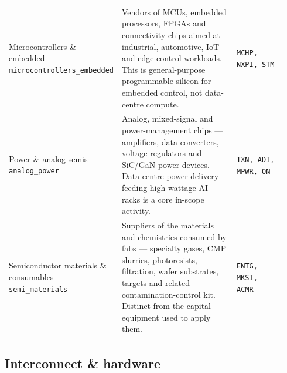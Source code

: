 \documentclass[11pt,a4paper,oneside]{article}
\begin{document}
\begin{longtable}{@{}p{0.20\linewidth} p{0.52\linewidth} p{0.22\linewidth}@{}}
\addlinespace
Microcontrollers \& embedded \newline \texttt{microcontrollers\_embedded} & Vendors of MCUs, embedded processors, FPGAs and connectivity chips aimed at industrial, automotive, IoT and edge control workloads. This is general-purpose programmable silicon for embedded control, not data-centre compute. & \texttt{MCHP, NXPI, STM} \\
\addlinespace
Power \& analog semis \newline \texttt{analog\_power} & Analog, mixed-signal and power-management chips --- amplifiers, data converters, voltage regulators and SiC/GaN power devices. Data-centre power delivery feeding high-wattage AI racks is a core in-scope activity. & \texttt{TXN, ADI, MPWR, ON} \\
\addlinespace
Semiconductor materials \& consumables \newline \texttt{semi\_materials} & Suppliers of the materials and chemistries consumed by fabs --- specialty gases, CMP slurries, photoresists, filtration, wafer substrates, targets and related contamination-control kit. Distinct from the capital equipment used to apply them. & \texttt{ENTG, MKSI, ACMR} \\
\end{longtable}

\subsection*{Interconnect \& hardware}
\end{document}
